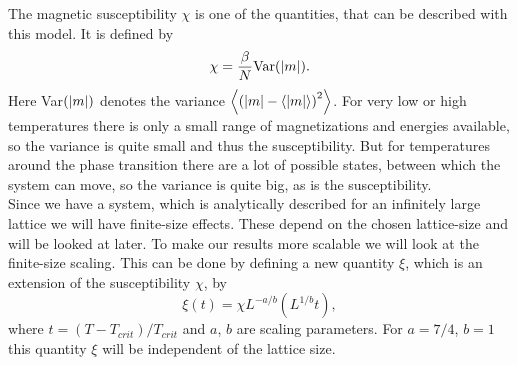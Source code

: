 The magnetic susceptibility $\chi$ is one of the quantities, that can be described with this model. It is defined by
\begin{equation}
 \chi = \frac{\beta}{N} \text{Var}(\left\vert m \right\vert).\label{eq:suscep}
\end{equation}
Here Var$(\left\vert m \right\vert)$ denotes the variance $\left\langle{(\left\vert m \right\vert - \left\langle\left\vert m \right\vert\right\rangle)} ^2\right\rangle$. For very low or high temperatures there is only a small range of magnetizations and energies available, so the variance is quite small and thus the susceptibility. But for temperatures around the phase transition there are a lot of possible states, between which the system can move, so the variance is quite big, as is the susceptibility.\\

Since we have a system, which is analytically described for an infinitely large lattice we will have finite-size effects. These depend on the chosen lattice-size and will be looked at later. To make our results more scalable we will look at the finite-size scaling. This can be done by defining a new quantity $\xi$, which is an extension of the susceptibility $\chi$, by
\begin{equation}
  \xi(t) = \chi L^{-a/b} (L^{1/b} t),
\end{equation}
where $t = (T - T_{crit})/T_{crit}$ and $a$, $b$ are scaling parameters. For $a = 7/4$, $b = 1$ this quantity $\xi$ will be independent of the lattice size.
